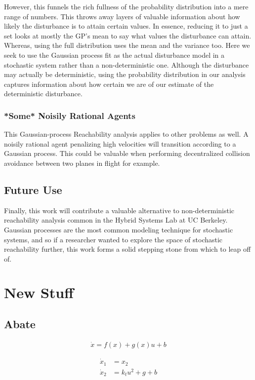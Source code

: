 \documentclass[a4paper]{article}
\begin{document}
However, this funnels the rich fullness of the probability distribution into a mere range of numbers.
This throws away layers of valuable information about how likely the disturbance is to attain certain values.
In essence, reducing it to just a set looks at mostly the GP's mean to say what values the disturbance can attain.
Whereas, using the full distribution uses the mean and the variance too.
Here we seek to use the Gaussian process fit as the actual disturbance model in a stochastic system rather than a non-deterministic one.
Although the disturbance may actually be deterministic, using the probability distribution in our analysis captures information about how certain we are of our estimate of the deterministic disturbance.
\subsubsection{*Some* Noisily Rational Agents}
This Gaussian-process Reachability analysis applies to other problems as well.
A noisily rational agent penalizing high velocities will transition according to a Gaussian process.
This could be valuable when performing decentralized collision avoidance between two planes in flight for example.
\subsection{Future Use}
Finally, this work will contribute a valuable alternative to non-deterministic reachability analysis common in the Hybrid Systems Lab at UC Berkeley. Gaussian processes are the most common modeling technique for stochastic systems, and so if a researcher wanted to explore the space of stochastic reachability further, this work forms a solid stepping stone from which to leap off of.

\section{New Stuff}
\subsection{Abate}

\begin{align*}
\dot{x} = f(x) + g(x) u + b
\end{align*}

\begin{align*}
\dot{x}_1 &= x_2
\\
\dot{x}_2 &= k_t u^2 + g + b
\end{align*}
\end{document}

